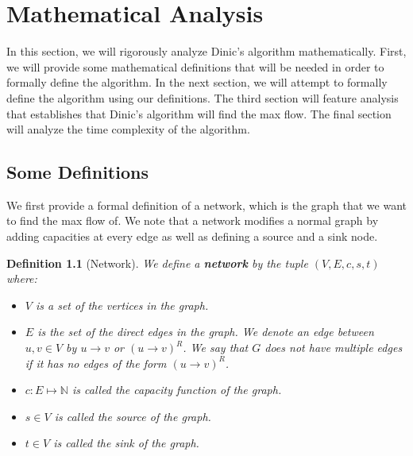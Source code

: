 \documentclass{report}
\newtheorem{definition}{Definition}[section]
\begin{document}
\chapter{Mathematical Analysis}
In this section, we will rigorously analyze Dinic's algorithm mathematically. First, we will provide some mathematical definitions that will be needed in order to formally define the algorithm. In the next section, we will attempt to formally define the algorithm using our definitions. The third section will feature analysis that establishes that Dinic's algorithm will find the max flow. The final section will analyze the time complexity of the algorithm.
\section{Some Definitions}
We first provide a formal definition of a network, which is the graph that we want to find the max flow of. We note that a network modifies a normal graph by adding capacities at every edge as well as defining a source and a sink node.
\begin{definition}[Network]
    We define a \textbf{network} by the tuple $(V, E, c, s, t)$ where:
    \begin{itemize}
        \item $V$ is a set of the vertices in the graph.
        \item $E$ is the set of the direct edges in the graph. We denote an edge between $u, v \in V$ by $u \rightarrow v$ or $(u \rightarrow v)^R$. We say that $G$ does not have multiple edges if it has no edges of the form $(u \rightarrow v)^R$.
        \item $c : E \mapsto \mathbb{N}$ is called the capacity function of the graph.
        \item $s \in V$ is called the source of the graph.
        \item $t \in V$ is called the sink of the graph.
    \end{itemize}
\end{definition}
\end{document}
